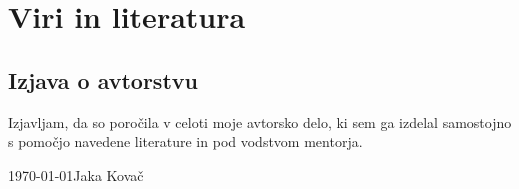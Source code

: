 \documentclass[12pt]{article}
\begin{document}
\newpage
\begingroup
\makeatletter
	\section{Viri in literatura}
	\nocite{*}
	\printbibliography[heading=none]

\makeatother
\endgroup
\newpage

\begin{samepage}
	\thispagestyle{empty}
	\section*{Izjava o avtorstvu}
	Izjavljam, da so poročila v celoti moje avtorsko delo, ki sem ga 
	izdelal samostojno s pomočjo navedene literature in pod vodstvom mentorja.

	\vfill
	
	\today \hfill Jaka Kovač
	
	\vspace{3 cm}
\end{samepage}
\end{document}
